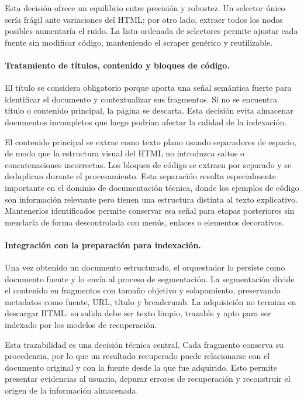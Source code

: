 \documentclass[11pt]{article}
\begin{document}
Esta decisión ofrece un equilibrio entre precisión y robustez. Un selector único sería frágil ante
variaciones del HTML; por otro lado, extraer todos los nodos posibles aumentaría el ruido. La
lista ordenada de selectores permite ajustar cada fuente sin modificar código, manteniendo el
scraper genérico y reutilizable.

\paragraph{Tratamiento de títulos, contenido y bloques de código.}
El título se considera obligatorio porque aporta una señal semántica fuerte para identificar el
documento y contextualizar sus fragmentos. Si no se encuentra título o contenido principal, la
página se descarta. Esta decisión evita almacenar documentos incompletos que luego podrían
afectar la calidad de la indexación.

El contenido principal se extrae como texto plano usando separadores de espacio, de modo que la
estructura visual del HTML no introduzca saltos o concatenaciones incorrectas. Los bloques de
código se extraen por separado y se deduplican durante el procesamiento. Esta separación resulta
especialmente importante en el dominio de documentación técnica, donde los ejemplos de código
son información relevante pero tienen una estructura distinta al texto explicativo. Mantenerlos
identificados permite conservar esa señal para etapas posteriores sin mezclarla de forma
descontrolada con menús, enlaces o elementos decorativos.

\paragraph{Integración con la preparación para indexación.}
Una vez obtenido un documento estructurado, el orquestador lo persiste como documento fuente y
lo envía al proceso de segmentación. La segmentación divide el contenido en fragmentos con
tamaño objetivo y solapamiento, preservando metadatos como fuente, URL, título y breadcrumb. La
adquisición no termina en descargar HTML: su salida debe ser texto limpio, trazable y apto para
ser indexado por los modelos de recuperación.

Esta trazabilidad es una decisión técnica central. Cada fragmento conserva su procedencia, por lo
que un resultado recuperado puede relacionarse con el documento original y con la fuente desde la
que fue adquirido. Esto permite presentar evidencias al usuario, depurar errores de recuperación y
reconstruir el origen de la información almacenada.
\end{document}
